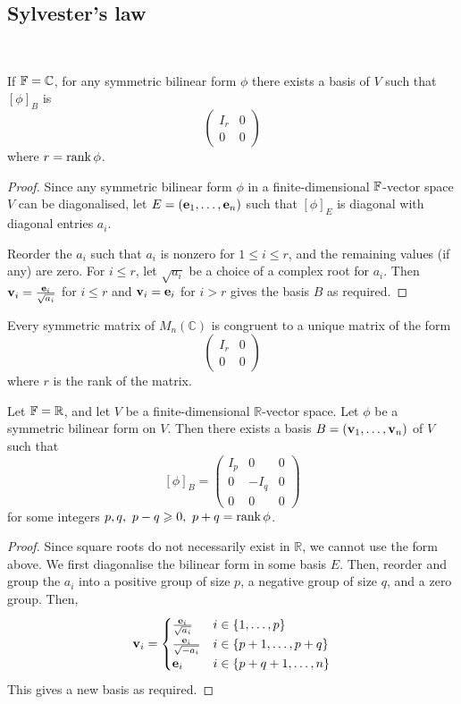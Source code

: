 \documentclass[a4paper]{article}
\begin{document}
\subsection{Sylvester's law}
\ \vspace*{-1.5em}
\begin{corollary}
	If \( {\mathbb{F}} = \mathbb C \), for any symmetric bilinear form \( \phi \) there exists a basis of \( V \) such that \( [\phi]_B \) is
	\[
		\begin{pmatrix}
			I_r & 0 \\
			0   & 0
		\end{pmatrix}
	\]
	where $ r = \rank \phi $. 
\end{corollary}
\begin{proof}
	Since any symmetric bilinear form \( \phi \) in a finite-dimensional \( {\mathbb{F}} \)-vector space \( V \) can be diagonalised, let \( E = ({\bf e}_1, \dots, {\bf e}_n) \) such that \( [\phi]_E \) is diagonal with diagonal entries \( a_i \).

	Reorder the \( a_i \) such that \( a_i \) is nonzero for \( 1 \leq i \leq r \), and the remaining values (if any) are zero.
	For \( i \leq r \), let \( \sqrt{a_i} \) be a choice of a complex root for \( a_i \).
	Then \( {\bf v}_i = \frac{{\bf e}_i}{\sqrt{a_i}} \) for \( i \leq r \) and \( {\bf v}_i = {\bf e}_i \) for \( i > r \) gives the basis \( B \) as required.
\end{proof}
\begin{corollary}
	Every symmetric matrix of \( M_n(\mathbb C) \) is congruent to a unique matrix of the form
	\[
		\begin{pmatrix}
			I_r & 0 \\
			0   & 0
		\end{pmatrix}
	\]
	where \( r \) is the rank of the matrix.
\end{corollary}
\begin{corollary}
	Let \( {\mathbb{F}} = \mathbb R \), and let \( V \) be a finite-dimensional \( \mathbb R \)-vector space.
	Let \( \phi \) be a symmetric bilinear form on \( V \).
	Then there exists a basis \( B = ({\bf v}_1, \dots, {\bf v}_n) \) of \( V \) such that
	\[
		[\phi]_B = \begin{pmatrix}
			I_p & 0    & 0 \\
			0   & -I_q & 0 \\
			0   & 0    & 0
		\end{pmatrix}
	\]
	for some integers \( p, q ,\ p-q\geqslant 0,\ p+q = \rank \phi\).
\end{corollary}
\begin{proof}
	Since square roots do not necessarily exist in \( \mathbb R \), we cannot use the form above.
	We first diagonalise the bilinear form in some basis \( E \).
	Then, reorder and group the \( a_i \) into a positive group of size \( p \), a negative group of size \( q \), and a zero group.
	Then,
	\[
		{\bf v}_i = \begin{cases}
			\frac{{\bf e}_i}{\sqrt{a_i}}  & i \in \qty{1, \dots, p}     \\
			\frac{{\bf e}_i}{\sqrt{-a_i}} & i \in \qty{p+1, \dots, p+q} \\
			{\bf e}_i                     & i \in \qty{p+q+1, \dots, n}
		\end{cases}
	\]
	This gives a new basis as required.
\end{proof}
\end{document}
